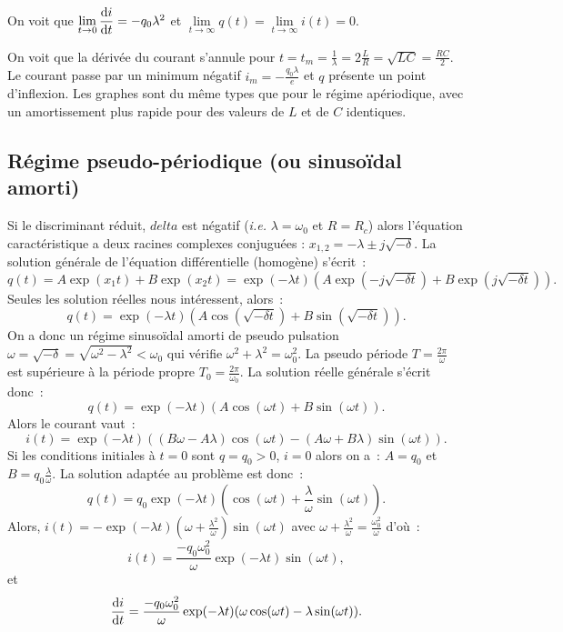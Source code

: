 		On voit que $\lim\limits_{t \to 0} \dfrac{\mathrm{d} i}{\mathrm{d} t} = -q_0\lambda^2$ et $\lim\limits_{t \to \infty} q(t) = \lim\limits_{t \to \infty} i(t) = 0$.

		On voit que la dérivée du courant s'annule pour $t=t_m = \frac{1}{\lambda} = 2\frac{L}{R} = \sqrt{LC} = \frac{RC}{2}$. Le courant passe par un minimum négatif $i_m=-\frac{q_0 \lambda}{e}$ et $q$ présente un point d'inflexion. Les graphes sont du même types que pour le régime apériodique, avec un amortissement plus rapide pour des valeurs de $L$ et de $C$ identiques.
	\subsection{Régime pseudo-périodique (ou sinusoïdal amorti)}
		Si le discriminant réduit, $delta$ est négatif (\emph{i.e.} $\lambda = \omega_0$ et $R = R_c$) alors l'équation caractéristique a deux racines complexes conjuguées : $x_{1, 2} = -\lambda \pm j\sqrt{-\delta}$. La solution générale de l'équation différentielle (homogène) s'écrit~:
		\begin{equation}
			q(t) = A \exp(x_1 t) + B \exp(x_2 t) = \exp(-\lambda t)(A\exp(-j\sqrt{-\delta t})+B\exp(j\sqrt{-\delta t})).
		\end{equation}
		Seules les solution réelles nous intéressent, alors~:
		\begin{equation}
			q(t) = \exp(-\lambda t)(A\cos(\sqrt{-\delta t}) + B\sin(\sqrt{-\delta t})).
		\end{equation}
		On a donc un régime sinusoïdal amorti de pseudo pulsation $\omega=\sqrt{-\delta} = \sqrt{\omega^2 - \lambda^2}<\omega_0$ qui vérifie $\omega^2 +\lambda^2 = \omega_0^2$. La pseudo période $T=\frac{2\pi}{\omega}$ est supérieure à la période propre $T_0=\frac{2\pi}{\omega_0}$. La solution réelle générale s'écrit donc~:
		\begin{equation}
			q(t) = \exp(-\lambda t)(A\cos(\omega t)+B\sin(\omega t)).
		\end{equation}
		Alors le courant vaut~:
		\begin{equation}
			i(t) = \exp(-\lambda t)((B\omega - A\lambda)\cos(\omega t) - (A\omega + B\lambda)\sin(\omega t)).
		\end{equation}
		Si les conditions initiales à $t=0$ sont $q=q_0>0$, $i=0$ alors on a~: $A=q_0$ et $B=q_0\frac{\lambda}{\omega}$. La solution adaptée au problème est donc~:
		\begin{equation}
			q(t) = q_0 \exp(-\lambda t)\left(\cos(\omega t) + \frac{\lambda}{\omega} \sin(\omega t)\right).
		\end{equation}
		Alors, $i(t) = -\exp(-\lambda t) \left(\omega +\frac{\lambda^2}{\omega}\right)\sin(\omega t)$ avec $\omega + \frac{\lambda^2}{\omega} = \frac{\omega_0^2}{\omega}$ d'où~:
		\begin{equation}
			i(t) = \frac{-q_0\omega_0^2}{\omega}\exp(-\lambda t) \sin(\omega t),
		\end{equation}
		et
		\begin{equation}
			\dfrac{\mathrm{d} i}{\mathrm{d} t} = \frac{-q_0\omega_0^2}{\omega}\exp(-\lambda t) (\omega \cos(\omega t) - \lambda \sin(\omega t)).
		\end{equation}

